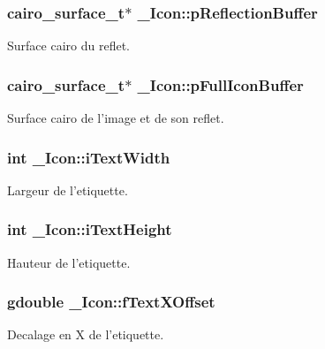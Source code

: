 \subsubsection{\setlength{\rightskip}{0pt plus 5cm}cairo\_\-surface\_\-t$\ast$ {\bf \_\-Icon::pReflectionBuffer}}\label{struct__Icon_50875c55a277b82454943fafc462a299}


Surface cairo du reflet. 

\subsubsection{\setlength{\rightskip}{0pt plus 5cm}cairo\_\-surface\_\-t$\ast$ {\bf \_\-Icon::pFullIconBuffer}}\label{struct__Icon_4e57fdf58863fa55440149a73907edca}


Surface cairo de l'image et de son reflet. 

\subsubsection{\setlength{\rightskip}{0pt plus 5cm}int {\bf \_\-Icon::iTextWidth}}\label{struct__Icon_9711919e518a35cb4409033221db63a9}


Largeur de l'etiquette. 

\subsubsection{\setlength{\rightskip}{0pt plus 5cm}int {\bf \_\-Icon::iTextHeight}}\label{struct__Icon_7d3c6d0abb489f7d4eb7be7865163b10}


Hauteur de l'etiquette. 

\subsubsection{\setlength{\rightskip}{0pt plus 5cm}gdouble {\bf \_\-Icon::fTextXOffset}}\label{struct__Icon_732eeef9df7a86833b6e800be2bd6507}


Decalage en X de l'etiquette. 

